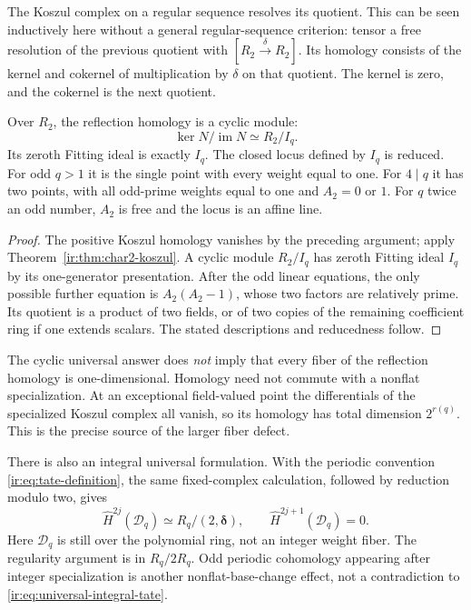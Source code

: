 The Koszul complex on a regular sequence resolves its quotient. This
can be seen inductively here without a general regular-sequence
criterion: tensor a free resolution of the previous quotient with
$[R_2\xrightarrow{\delta}R_2]$. Its homology consists of the kernel
and cokernel of multiplication by $\delta$ on that quotient. The
kernel is zero, and the cokernel is the next quotient.

\begin{corollary}
\label{ir:cor:universal-support}
Over $R_2$, the reflection homology is a cyclic module:
\begin{equation}\label{ir:eq:universal-homology}
 \ker N/\operatorname{im} N\simeq R_2/I_q.
\end{equation}
Its zeroth Fitting ideal is exactly $I_q$. The closed locus defined
by $I_q$ is reduced. For odd $q>1$ it is the single point with every
weight equal to one. For $4\mid q$ it has two points, with all
odd-prime weights equal to one and $A_2=0$ or $1$. For $q$ twice an
odd number, $A_2$ is free and the locus is an affine line.
\end{corollary}
\begin{proof}
The positive Koszul homology vanishes by the preceding argument;
apply Theorem~\ref{ir:thm:char2-koszul}. A cyclic module $R_2/I_q$
has zeroth Fitting ideal $I_q$ by its one-generator presentation.
After the odd linear equations, the only possible further equation
is $A_2(A_2-1)$, whose two factors are relatively prime. Its quotient
is a product of two fields, or of two copies of the remaining
coefficient ring if one extends scalars. The stated descriptions
and reducedness follow.
\end{proof}

The cyclic universal answer does \emph{not} imply that every fiber
of the reflection homology is one-dimensional. Homology need not
commute with a nonflat specialization. At an exceptional field-valued
point the differentials of the specialized Koszul complex all vanish,
so its homology has total dimension $2^{r(q)}$. This is the precise
source of the larger fiber defect.

There is also an integral universal formulation. With the periodic
convention \eqref{ir:eq:tate-definition}, the same fixed-complex
calculation, followed by reduction modulo two, gives
\begin{equation}\label{ir:eq:universal-integral-tate}
 \widehat H^{2j}(\mathcal D_q)\simeq R_q/(2,\boldsymbol\delta),\qquad
 \widehat H^{2j+1}(\mathcal D_q)=0.
\end{equation}
Here $\mathcal D_q$ is still over the polynomial ring, not an integer weight
fiber. The regularity argument is in $R_q/2R_q$. Odd periodic
cohomology appearing after integer specialization is another
nonflat-base-change effect, not a contradiction to
\eqref{ir:eq:universal-integral-tate}.


